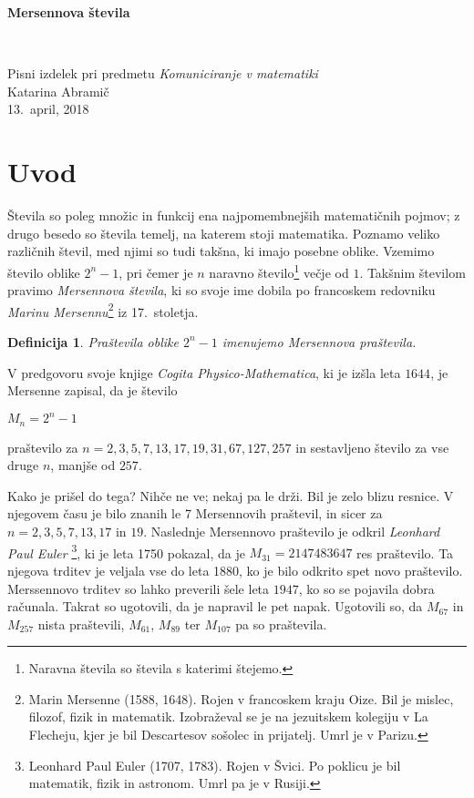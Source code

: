 \documentclass[12pt]{article}
\newtheorem{Definicija}[Izrek]{{\sc Definicija}}
\newenvironment{definicija}{\begin{Definicija}\rm }{\end{Definicija}}
\begin{document}
\thispagestyle{empty}
\begin{center}
\begin{Large}
{\bf Mersennova števila}
\end{Large}
\\[5mm]
\begin{large}
Pisni izdelek pri predmetu {\em Komuniciranje v matematiki}
\\[5mm]
{\sc Katarina Abramič}
\\[10mm]
13.~april, 2018
\end{large}

\end{center}

\newpage
\setcounter{page}{1}

\section{Uvod}
Števila so poleg množic in funkcij ena najpomembnejših matematičnih pojmov; z drugo besedo so števila temelj, na katerem stoji matematika.
\newline 
Poznamo veliko različnih števil, med njimi so tudi takšna, ki imajo posebne oblike. Vzemimo število oblike $2^n - 1$, pri čemer je $n$ naravno število\footnote{Naravna števila so števila s katerimi štejemo.} večje od $1$. Takšnim številom pravimo {\em Mersennova števila}, ki so svoje ime dobila po francoskem redovniku {\em Marinu Mersennu}\footnote{Marin Mersenne (1588, 1648). Rojen v francoskem kraju Oize. Bil je mislec, filozof, fizik in matematik. Izobraževal se je na jezuitskem kolegiju v La Flecheju, kjer je bil Descartesov sošolec in prijatelj. Umrl je v Parizu.} iz 17.~stoletja. 
\begin{definicija}
Praštevila oblike $2^n-1$ imenujemo Mersennova praštevila.
\end{definicija}
V predgovoru svoje knjige {\em Cogita Physico-Mathematica}, ki je izšla leta $1644$, je Mersenne zapisal, da je število 
\begin{center}
$M_n = 2^n -1 $
\end{center}
praštevilo za $n = 2, 3, 5, 7, 13, 17, 19, 31, 67, 127, 257$ in sestavljeno število za vse druge $n$, manjše od $257$.

Kako je prišel do tega? Nihče ne ve; nekaj pa le drži. Bil je zelo blizu resnice. V njegovem času je bilo znanih le 7 Mersennovih praštevil, in sicer za $n=2,3,5,7,13,17$ in $19$. Naslednje Mersennovo praštevilo je odkril {\em Leonhard Paul Euler} \footnote{Leonhard Paul Euler (1707, 1783). Rojen v Švici. Po poklicu je bil matematik, fizik in astronom. Umrl pa je v Rusiji.}, ki je leta 1750 pokazal, da je  $M_{31}=2147483647$ res praštevilo. Ta njegova trditev je veljala vse do leta 1880, ko je bilo odkrito spet novo praštevilo.
\newline
Merssennovo trditev so lahko preverili šele leta $1947$, ko so se pojavila dobra računala. Takrat so ugotovili, da je napravil le pet napak. Ugotovili so, da $M_{67}$ in $M_{257}$ nista praštevili, $M_{61}$, $M_{89}$ ter $M_{107}$ pa so praštevila.
\end{document}
